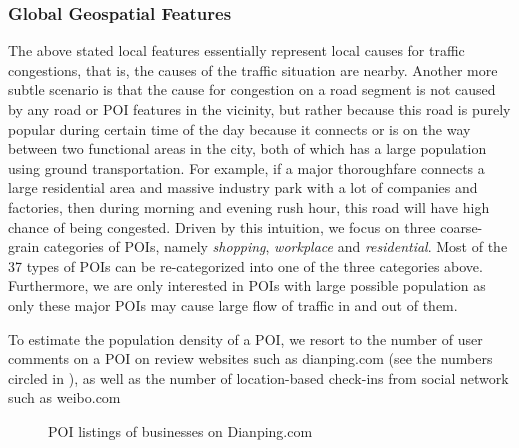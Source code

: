 \subsubsection{Global Geospatial Features}
\label{sec:globalfeatures}
The above stated local features essentially represent local causes for 
traffic congestions, that is, the causes of the traffic situation are nearby.
Another more subtle scenario is that the cause for congestion on a road segment
is not caused by any road or POI features in the vicinity, but rather because
this road is purely popular during certain time of the day because it connects
or is on the way between two functional areas in the city, 
both of which has a large population using
ground transportation. For example, if a major thoroughfare connects a large
residential area and massive industry park with a lot of companies and factories,
then during morning and evening rush hour, this road will have high chance of
being congested. Driven by this intuition, we focus on three coarse-grain categories
of POIs, namely {\em shopping}, {\em workplace} and {\em residential}.
Most of the 37 types of POIs can be re-categorized into one of the three
categories above. Furthermore, we are only interested in POIs with large
possible population as only these major POIs may cause large flow of traffic
in and out of them. 

To estimate the population density of a POI, we resort to the number of user
comments on a POI on review websites such as dianping.com 
(see the numbers circled in ), as well as
the number of location-based check-ins from social network such as weibo.com

\begin{figure}[th]
	\centering
	\caption{POI listings of businesses on Dianping.com}
	\label{fig:dianpingexample}
\end{figure}


